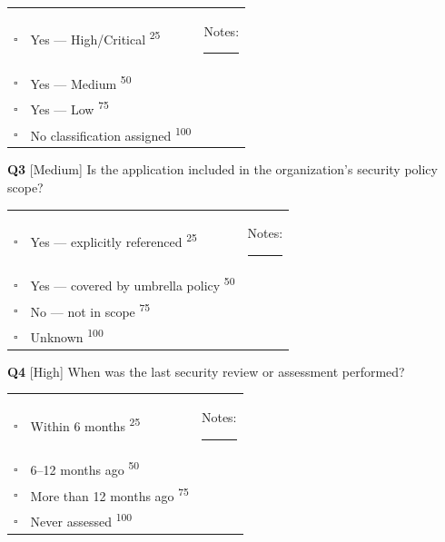 \documentclass[11pt,landscape]{article}
\begin{document}
\begin{tabularx}{\textwidth}{cXX}
$\square$ & Yes --- High/Critical \textsuperscript{\scriptsize\textcolor{stridegray}{25}} & Notes: \rule{4cm}{0.4pt} \\
$\square$ & Yes --- Medium \textsuperscript{\scriptsize\textcolor{stridegray}{50}} &  \\
$\square$ & Yes --- Low \textsuperscript{\scriptsize\textcolor{stridegray}{75}} &  \\
$\square$ & No classification assigned \textsuperscript{\scriptsize\textcolor{stridegray}{100}} &  \\
\end{tabularx}

\vspace{0.3cm}

\noindent\colorbox{medbg}{\textbf{Q3} [Medium]} Is the application included in the organization's security policy scope?

\begin{tabularx}{\textwidth}{cXX}
$\square$ & Yes --- explicitly referenced \textsuperscript{\scriptsize\textcolor{stridegray}{25}} & Notes: \rule{4cm}{0.4pt} \\
$\square$ & Yes --- covered by umbrella policy \textsuperscript{\scriptsize\textcolor{stridegray}{50}} &  \\
$\square$ & No --- not in scope \textsuperscript{\scriptsize\textcolor{stridegray}{75}} &  \\
$\square$ & Unknown \textsuperscript{\scriptsize\textcolor{stridegray}{100}} &  \\
\end{tabularx}

\vspace{0.3cm}

\noindent\colorbox{highbg}{\textbf{Q4} [High]} When was the last security review or assessment performed?

\begin{tabularx}{\textwidth}{cXX}
$\square$ & Within 6 months \textsuperscript{\scriptsize\textcolor{stridegray}{25}} & Notes: \rule{4cm}{0.4pt} \\
$\square$ & 6--12 months ago \textsuperscript{\scriptsize\textcolor{stridegray}{50}} &  \\
$\square$ & More than 12 months ago \textsuperscript{\scriptsize\textcolor{stridegray}{75}} &  \\
$\square$ & Never assessed \textsuperscript{\scriptsize\textcolor{stridegray}{100}} &  \\
\end{tabularx}
\end{document}
